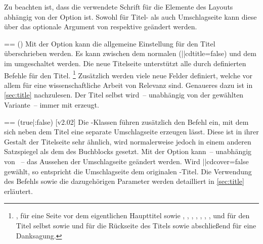 \begin{DeclareEntity*}{}
\begin{DeclareEntity*}{}
\begin{DeclareEntity*}{}
Zu beachten ist, dass die verwendete Schrift für die Elemente des Layouts 
abhängig von der Option  ist. Sowohl für Titel- als auch
Umschlagseite kann diese über das optionale Argument von  
respektive  geändert werden.

\begin{Declaration}
  {}=\cdalias=
  ()
Mit der Option  kann die allgemeine Einstellung für den Titel 
überschrieben werden. Es kann zwischen dem normalen (\Option||{cdtitle=false}) 
und dem im \CD umgeschaltet werden. Die neue Titelseite unterstützt alle durch 
\KOMAScript definierten Befehle für den Titel.%
\footnote{%
  , 
   für eine Seite vor dem eigentlichen 
  Haupttitel sowie ,  
  , ,
  , ,
  , , 
   und  für den 
  Titel selbst sowie  und
   für die Rückseite des 
  Titels sowie abschließend  für eine 
  Danksagung.
}
Zusätzlich werden viele neue Felder definiert, welche vor allem für eine 
wissenschaftliche Arbeit von Relevanz sind. Genaueres dazu ist in 
\autoref{sec:title} nachzulesen. Der Titel selbst wird~-- unabhängig von der 
gewählten Variante~-- immer mit  erzeugt.
\end{Declaration}

\begin{Declaration}
  {}=\cdalias=
  (true|:false)
  [v2.02]
Die \TUDScript-Klassen führen zusätzlich den Befehl  ein, mit 
dem sich neben dem Titel eine separate Umschlagseite erzeugen lässt. Diese ist 
in ihrer Gestalt der Titelseite sehr ähnlich, wird normalerweise jedoch in 
einem anderen Satzspiegel als dem des Buchblocks gesetzt. Mit der Option 
 kann~-- unabhängig von ~-- das Aussehen der 
Umschlagseite geändert werden. Wird \Option||{cdcover=false} gewählt, so 
entspricht die Umschlagseite dem originalen \KOMAScript-Titel. Die Verwendung 
des Befehls  sowie die dazugehörigen Parameter werden 
detailliert in \autoref{sec:title} erläutert.
\end{Declaration}


\end{DeclareEntity*}
\end{DeclareEntity*}
\end{DeclareEntity*}
